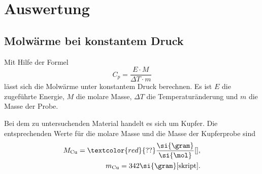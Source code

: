 \section{Auswertung}
\subsection{Molwärme bei konstantem Druck}
Mit Hilfe der Formel
\begin{equation}
  C_p = \frac{E \cdot M}{\Delta T \cdot m}
\end{equation}
lässt sich die Molwärme unter konstantem Druck berechnen.
Es ist $E$ die zugeführte Energie, $M$ die molare Masse, $\Delta T$ die Temperaturänderung und $m$ die Masse der Probe.

Bei dem zu untersuchenden Material handelt es sich um Kupfer.
Die entsprechenden Werte für die molare Masse und die Masse der Kupferprobe sind
\begin{align*}
  M_{\text{Cu}} = \textcolor{red}{??}\frac{\si{\gram}}{\si{\mol}} \cite{}, \\
  m_{\text{Cu}} = 342\si{\gram} \cite{skript}.
\end{align*}
